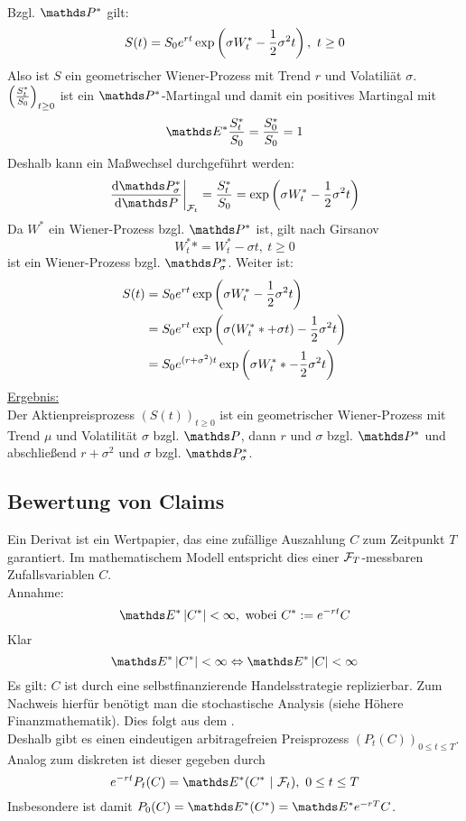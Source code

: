 \\
Bzgl. $\Pw^*$ gilt:
\[
S(t)=S_0 e^{r t}\exp\left( \sigma W_t^*-\frac{1}{2}\sigma^2t\right),~t\ge 0
\]
Also ist $S$ ein geometrischer Wiener-Prozess mit Trend $r$ und Volatiliät $\sigma$.\\
$\left( \frac{S_t^*}{S_0}\right)_{t\ge0}$ ist ein $\Pw^*$-Martingal und damit ein positives Martingal mit
\[
\E^*\frac{S_t^*}{S_0}=\frac{S_0^*}{S_0}=1
\]
Deshalb kann ein Maßwechsel durchgeführt werden:
\[
\left.\difff{\Pw_\sigma^*}{\Pw}\right|_{\F_t}=\frac{S_t^*}{S_0}=\exp\enbrace{\sigma W_t^*-\frac{1}{2}\sigma^2t}
\]
Da $W^*$ ein Wiener-Prozess bzgl. $\Pw^*$ ist, gilt nach Girsanov
\[
W_t^**=W_t^*-\sigma t,~t\ge0
\]
ist ein Wiener-Prozess bzgl. $\Pw_\sigma^*$.
Weiter ist:
\begin{equation*}
\begin{aligned}
	S(t)&= S_0 e^{r t}\exp\left( \sigma W_t^*-\frac{1}{2}\sigma^2t\right)\\
	&= S_0 e^{rt}\exp\left( \sigma(W_t^**+\sigma t)-\frac{1}{2}\sigma^2t\right)\\
	&= S_0 e^{(r+\sigma^2)t}\exp\left( \sigma W_t^**-\frac{1}{2}\sigma^2t\right)
\end{aligned}
\end{equation*}
\uline{Ergebnis:}\\
Der Aktienpreisprozess $(S(t))_{t\ge0}$ ist ein geometrischer Wiener-Prozess mit Trend $\mu$ und Volatilität $\sigma$ bzgl. $\Pw$, dann $r$ und $\sigma$ bzgl. $\Pw^*$ und abschließend $r+\sigma^2$ und $\sigma$ bzgl. $\Pw_\sigma^*$. 

\subsection{Bewertung von Claims}
\label{sub:bewertung_claims}
Ein Derivat ist ein Wertpapier, das eine zufällige Auszahlung $C$ zum Zeitpunkt $T$ garantiert.
Im mathematischem Modell entspricht dies einer $\mathcal{F}_T$-messbaren Zufallsvariablen $C$.\\
Annahme:
\[
\E^*\abs{C^*}<\infty, \text{ wobei } C^*:=e^{-rt}C
\]
Klar
\[
\E^*\abs{C^*}<\infty \Leftrightarrow \E^*\abs{C}<\infty
\]
Es gilt:
$C$ ist durch eine selbstfinanzierende Handelsstrategie replizierbar.
Zum Nachweis hierfür benötigt man die stochastische Analysis (siehe Höhere Finanzmathematik).
Dies folgt aus dem .\\
Deshalb gibt es einen eindeutigen arbitragefreien Preisprozess $(P_t(C))_{0\le t\le T}$.
Analog zum diskreten ist dieser gegeben durch
\[
e^{-rt} P_t(C)= \E^*(C^*~|~\F_t),~0\le t\le T
\]
Insbesondere ist damit $P_0(C)=\E^*(C^*)=\E^*e^{-rT}C$.

